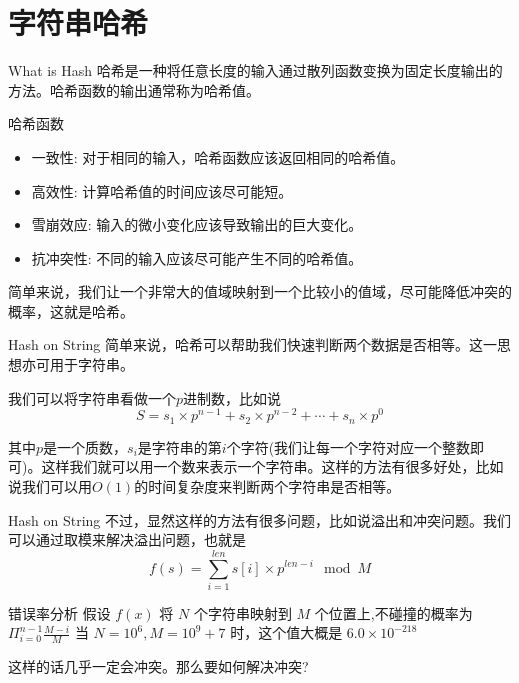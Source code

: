 \documentclass{ldr-simple-gray}
\begin{document}
  \section{字符串哈希}
  \begin{frame}{What is Hash}
    哈希是一种将任意长度的输入通过散列函数变换为固定长度输出的方法。哈希函数的输出通常称为哈希值。
    \begin{block}{哈希函数}
      \begin{itemize}
        \item 一致性: 对于相同的输入，哈希函数应该返回相同的哈希值。
        \item 高效性: 计算哈希值的时间应该尽可能短。
        \item 雪崩效应: 输入的微小变化应该导致输出的巨大变化。
        \item 抗冲突性: 不同的输入应该尽可能产生不同的哈希值。
      \end{itemize}
    \end{block}
    简单来说，我们让一个非常大的值域映射到一个比较小的值域，尽可能降低冲突的概率，这就是哈希。
  \end{frame}

  \begin{frame}{Hash on String}
    简单来说，哈希可以帮助我们快速判断两个数据是否相等。这一思想亦可用于字符串。\newline

    我们可以将字符串看做一个$p$进制数，比如说
    $$S = s_1 \times p^{n-1} + s_2 \times p^{n-2} + \cdots + s_n \times p^0$$

    其中$p$是一个质数，$s_i$是字符串的第$i$个字符(我们让每一个字符对应一个整数即可)。这样我们就可以用一个数来表示一个字符串。这样的方法有很多好处，比如说我们可以用$O(1)$的时间复杂度来判断两个字符串是否相等。
  \end{frame}

  \begin{frame}{Hash on String}
    不过，显然这样的方法有很多问题，比如说溢出和冲突问题。我们可以通过取模来解决溢出问题，也就是
    $$f(s)=\sum_{i=1}^{len}{s[i]\times{p^{len-i}}}\mod M$$

    \begin{block}{错误率分析}
      假设 $f(x)$ 将 $N$ 个字符串映射到 $M$ 个位置上,不碰撞的概率为 $\Pi_{i=0}^{n-1}{\frac{M-i}{M}}$\newline
      当 $N=10^6,M=10^9+7$ 时，这个值大概是 $6.0\times10^{-218}$
    \end{block}
  
    这样的话几乎一定会冲突。那么要如何解决冲突?
  \end{frame}
\end{document}
